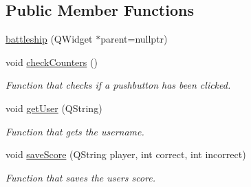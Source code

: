 \subsection*{Public Member Functions}
\begin{DoxyCompactItemize}
\item 
\hyperlink{classbattleship_ac40d202657fb7498a3ed6c6c625a3ca6}{battleship} (Q\+Widget $\ast$parent=nullptr)
\item 
void \hyperlink{classbattleship_a3e06e47874fec7fb9cc1fd23589d6f72}{check\+Counters} ()
\begin{DoxyCompactList}\small\item\em Function that checks if a pushbutton has been clicked. \end{DoxyCompactList}\item 
void \hyperlink{classbattleship_afddb8a1aca235146e2cc11e2b3c54d01}{get\+User} (Q\+String)
\begin{DoxyCompactList}\small\item\em Function that gets the username. \end{DoxyCompactList}\item 
void \hyperlink{classbattleship_a72fd3ca8ec081b72c888ffb8b5f95153}{save\+Score} (Q\+String player, int correct, int incorrect)
\begin{DoxyCompactList}\small\item\em Function that saves the user\textquotesingle{}s score. \end{DoxyCompactList}\end{DoxyCompactItemize}
